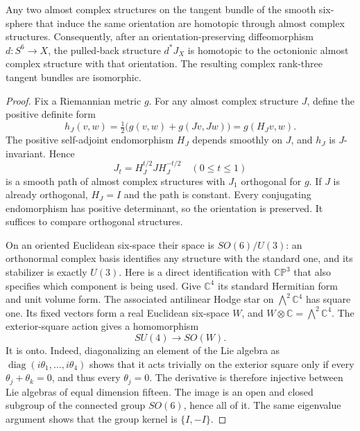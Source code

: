 \begin{proposition}
\label{mapsaudit:almost-complex-homotopy}
Any two almost complex structures on the tangent bundle of the smooth
six-sphere that induce the same orientation are homotopic through almost
complex structures. Consequently, after an orientation-preserving
diffeomorphism $d:S^6\to X$, the pulled-back structure $d^*J_X$ is
homotopic to the octonionic almost complex structure with that orientation.
The resulting complex rank-three tangent bundles are isomorphic.
\end{proposition}
\begin{proof}
Fix a Riemannian metric $g$. For any almost complex structure $J$, define
the positive definite form
\[
 h_J(v,w)=\tfrac12\bigl(g(v,w)+g(Jv,Jw)\bigr)=g(H_Jv,w).
\]
The positive self-adjoint endomorphism $H_J$ depends smoothly on $J$,
and $h_J$ is $J$-invariant. Hence
\[
 J_t=H_J^{t/2}JH_J^{-t/2}\quad(0\leq t\leq1)
\]
is a smooth path of almost complex structures with $J_1$ orthogonal for
$g$. If $J$ is already orthogonal, $H_J=I$ and the path is constant.
Every conjugating endomorphism has positive determinant, so the
orientation is preserved. It suffices to compare orthogonal structures.

On an oriented Euclidean six-space their space is
$SO(6)/U(3)$: an orthonormal complex basis identifies any structure
with the standard one, and its stabilizer is exactly $U(3)$.
Here is a direct identification with $\mathbb{CP}^3$ that also specifies
which component is being used. Give $\mathbb C^4$ its standard Hermitian
form and unit volume form. The associated antilinear Hodge star on
$\bigwedge^2\mathbb C^4$ has square one. Its fixed vectors form a real
Euclidean six-space $W$, and
$W\otimes\mathbb C=\bigwedge^2\mathbb C^4$.
The exterior-square action gives a homomorphism
\[
                    SU(4)\longrightarrow SO(W).
\]
It is onto. Indeed, diagonalizing an element of the Lie algebra as
$\operatorname{diag}(i\theta_1,\ldots,i\theta_4)$ shows that it acts
trivially on the exterior square only if every
$\theta_j+\theta_k=0$, and thus every $\theta_j=0$.
The derivative is therefore injective between Lie algebras of equal
dimension fifteen. The image is an open and closed subgroup of the
connected group $SO(6)$, hence all of it. The same eigenvalue argument
shows that the group kernel is $\{I,-I\}$.


\end{proof}
